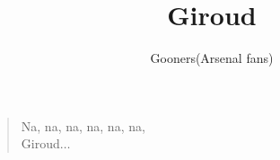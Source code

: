 \documentclass[a4paper,12pt]{article}
\title{Giroud}
\author{Gooners(Arsenal fans)}
\date{}
\begin{document}
	
	\maketitle
	
	\begin{verse}
		
		Na, na, na, na, na, na, \\
		Giroud$\ldots$
		
	\end{verse}
	
\end{document}
